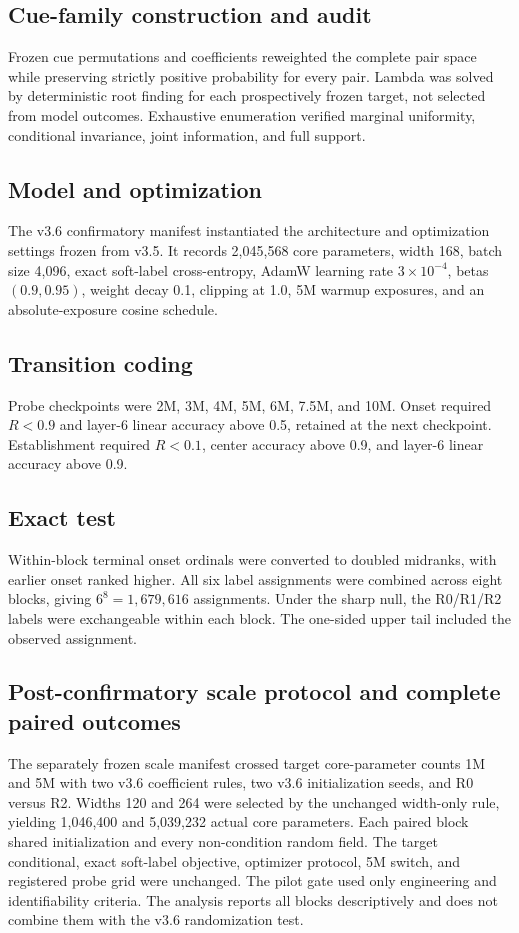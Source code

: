 \documentclass{article}
\begin{document}
\subsection{Cue-family construction and audit}
Frozen cue permutations and coefficients reweighted the complete pair space
while preserving strictly positive probability for every pair. Lambda was
solved by deterministic root finding for each prospectively frozen target, not
selected from model outcomes. Exhaustive enumeration verified marginal
uniformity, conditional invariance, joint information, and full support.

\subsection{Model and optimization}
The v3.6 confirmatory manifest instantiated the architecture and optimization
settings frozen from v3.5. It records
2,045,568 core
parameters, width 168, batch size
4,096, exact soft-label cross-entropy, AdamW
learning rate $3\times10^{-4}$,
betas
$(0.9,0.95)$, weight decay
0.1, clipping at 1.0,
5M warmup exposures, and an
absolute-exposure cosine schedule.

\subsection{Transition coding}
Probe checkpoints were 2M, 3M, 4M, 5M, 6M, 7.5M, and 10M. Onset required
$R<0.9$ and layer-6 linear accuracy above 0.5, retained at the next checkpoint.
Establishment required $R<0.1$, center accuracy above 0.9, and layer-6 linear
accuracy above 0.9.

\subsection{Exact test}
Within-block terminal onset ordinals were converted to doubled midranks, with
earlier onset ranked higher. All six label assignments were combined across
eight blocks, giving $6^8=1,679,616$ assignments.
Under the sharp null, the R0/R1/R2 labels were exchangeable within each block.
The one-sided upper tail included the observed assignment.

\subsection{Post-confirmatory scale protocol and complete paired outcomes}
The separately frozen scale manifest crossed target core-parameter counts 1M
and 5M with two v3.6 coefficient rules, two v3.6 initialization seeds, and R0
versus R2. Widths 120 and 264 were selected by the unchanged width-only rule,
yielding 1,046,400 and 5,039,232 actual core parameters. Each paired block
shared initialization and every non-condition random field. The target
conditional, exact soft-label objective, optimizer protocol, 5M switch, and
registered probe grid were unchanged. The pilot gate used only engineering and
identifiability criteria. The analysis reports all blocks descriptively and
does not combine them with the v3.6 randomization test.
\end{document}
